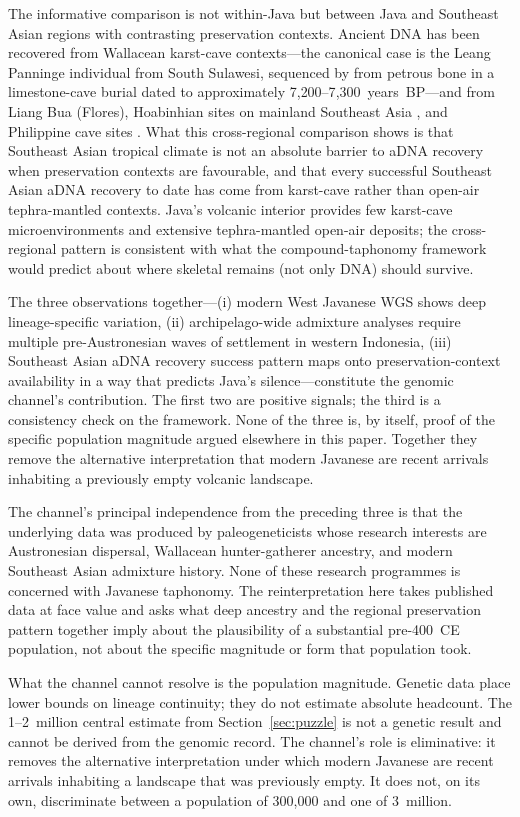 \documentclass[12pt,a4paper]{article}
\begin{document}
The informative comparison is not within-Java but between Java and Southeast Asian regions with contrasting preservation contexts. Ancient DNA has been recovered from Wallacean karst-cave contexts---the canonical case is the Leang Panninge individual from South Sulawesi, sequenced by \citet{carlhoff2021} from petrous bone in a limestone-cave burial dated to approximately 7{,}200--7{,}300~years~BP---and from Liang Bua (Flores), Hoabinhian sites on mainland Southeast Asia \citep{mccoll2018,lipson2018}, and Philippine cave sites \citep{larena2021}. What this cross-regional comparison shows is that Southeast Asian tropical climate is not an absolute barrier to aDNA recovery when preservation contexts are favourable, and that every successful Southeast Asian aDNA recovery to date has come from karst-cave rather than open-air tephra-mantled contexts. Java's volcanic interior provides few karst-cave microenvironments and extensive tephra-mantled open-air deposits; the cross-regional pattern is consistent with what the compound-taphonomy framework would predict about where skeletal remains (not only DNA) should survive.

The three observations together---(i) modern West Javanese WGS shows deep lineage-specific variation, (ii) archipelago-wide admixture analyses require multiple pre-Austronesian waves of settlement in western Indonesia, (iii) Southeast Asian aDNA recovery success pattern maps onto preservation-context availability in a way that predicts Java's silence---constitute the genomic channel's contribution. The first two are positive signals; the third is a consistency check on the framework. None of the three is, by itself, proof of the specific population magnitude argued elsewhere in this paper. Together they remove the alternative interpretation that modern Javanese are recent arrivals inhabiting a previously empty volcanic landscape.

The channel's principal independence from the preceding three is that the underlying data was produced by paleogeneticists whose research interests are Austronesian dispersal, Wallacean hunter-gatherer ancestry, and modern Southeast Asian admixture history. None of these research programmes is concerned with Javanese taphonomy. The reinterpretation here takes published data at face value and asks what deep ancestry and the regional preservation pattern together imply about the plausibility of a substantial pre-400~CE population, not about the specific magnitude or form that population took.

What the channel cannot resolve is the population magnitude. Genetic data place lower bounds on lineage continuity; they do not estimate absolute headcount. The 1--2~million central estimate from Section~\ref{sec:puzzle} is not a genetic result and cannot be derived from the genomic record. The channel's role is eliminative: it removes the alternative interpretation under which modern Javanese are recent arrivals inhabiting a landscape that was previously empty. It does not, on its own, discriminate between a population of 300{,}000 and one of 3~million.
\end{document}
